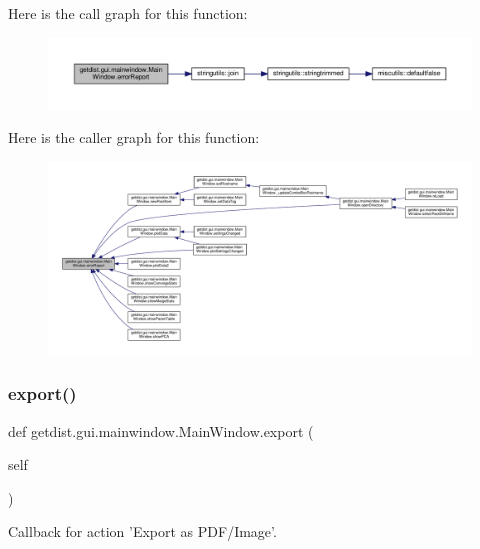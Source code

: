 Here is the call graph for this function\+:
\nopagebreak
\begin{figure}[H]
\begin{center}
\leavevmode
\includegraphics[width=350pt]{classgetdist_1_1gui_1_1mainwindow_1_1MainWindow_aa4d50e481a279bfc236264d54e794696_cgraph}
\end{center}
\end{figure}
Here is the caller graph for this function\+:
\nopagebreak
\begin{figure}[H]
\begin{center}
\leavevmode
\includegraphics[width=350pt]{classgetdist_1_1gui_1_1mainwindow_1_1MainWindow_aa4d50e481a279bfc236264d54e794696_icgraph}
\end{center}
\end{figure}
\mbox{\label{classgetdist_1_1gui_1_1mainwindow_1_1MainWindow_aceee119bf0260d396991cbdbb396538a}} 
\subsubsection{\texorpdfstring{export()}{export()}}
{\footnotesize\ttfamily def getdist.\+gui.\+mainwindow.\+Main\+Window.\+export (\begin{DoxyParamCaption}\item[{}]{self }\end{DoxyParamCaption})}

\begin{DoxyVerb}Callback for action 'Export as PDF/Image'.
\end{DoxyVerb}
 

